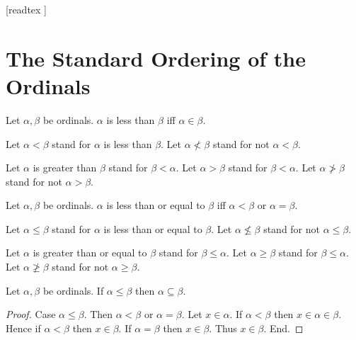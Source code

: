 \documentclass[10pt]{article}
\begin{document}
  \begin{imports}
    \begin{forthel}
      [readtex ]
    \end{forthel}
  \end{imports}


  \section*{The Standard Ordering of the Ordinals}

  \begin{forthel}
    \begin{definition}
      Let $\alpha, \beta$ be ordinals.
      $\alpha$ is less than $\beta$ iff $\alpha \in \beta$.
    \end{definition}

    Let $\alpha < \beta$ stand for $\alpha$ is less than $\beta$.
    Let $\alpha \nless \beta$ stand for not $\alpha < \beta$.

    Let $\alpha$ is greater than $\beta$ stand for $\beta < \alpha$.
    Let $\alpha > \beta$ stand for $\beta < \alpha$.
    Let $\alpha \ngtr \beta$ stand for not $\alpha > \beta$.
  \end{forthel}

  \begin{forthel}
    \begin{definition}
      Let $\alpha, \beta$ be ordinals.
      $\alpha$ is less than or equal to $\beta$ iff $\alpha < \beta$ or $\alpha = \beta$.
    \end{definition}

    Let $\alpha \leq \beta$ stand for $\alpha$ is less than or equal to $\beta$.
    Let $\alpha \nleq \beta$ stand for not $\alpha \leq \beta$.

    Let $\alpha$ is greater than or equal to $\beta$ stand for $\beta \leq \alpha$.
    Let $\alpha \geq \beta$ stand for $\beta \leq \alpha$.
    Let $\alpha \ngeq \beta$ stand for not $\alpha \geq \beta$.
  \end{forthel}

  \begin{forthel}
    \begin{proposition}
      Let $\alpha, \beta$ be ordinals.
      If $\alpha \leq \beta$ then $\alpha \subseteq \beta$.
    \end{proposition}
    \begin{proof}
      Case $\alpha \leq \beta$.
        Then $\alpha < \beta$ or $\alpha = \beta$.
        Let $x \in \alpha$.
        If $\alpha < \beta$ then $x \in \alpha \in \beta$.
        Hence if $\alpha < \beta$ then $x \in \beta$.
        If $\alpha = \beta$ then $x \in \beta$.
        Thus $x \in \beta$.
      End.
    \end{proof}
  \end{forthel}
\end{document}
